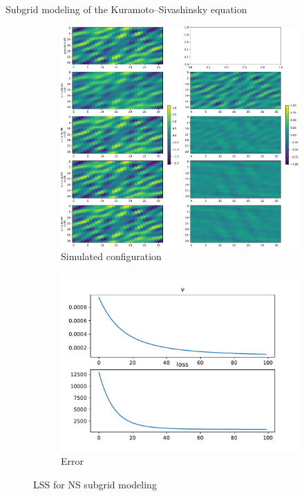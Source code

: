 \documentclass{beamer}
\begin{document}
\begin{frame}{Subgrid modeling of the Kuramoto–Sivashinsky equation}
	\begin{figure}[ht]
		\centering
		\begin{subfigure}{0.5\linewidth} %
			\centering
			\includegraphics[width=\linewidth]{fig/ns-lss-cloudmap.pdf}
			\caption{Simulated configuration}
		  \end{subfigure}%
		  \begin{subfigure}{0.5\linewidth} %
			\centering
			\includegraphics[width=\linewidth]{fig/ns-lss-nu.pdf}
			\caption{Error}
		  \end{subfigure}
		  \caption{LSS for NS subgrid modeling}
\end{figure}
\end{frame}
\end{document}
